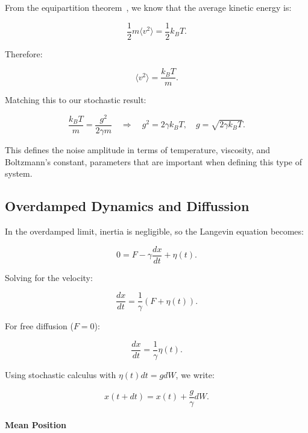 From the equipartition theorem~\cite{huang2009introduction}, we know that the average kinetic energy is:

\[
  \frac{1}{2} m \langle v^2 \rangle = \frac{1}{2} k_B T \text{.}
\]

Therefore:

\begin{equation}
  \langle v^2 \rangle = \frac{k_B T}{m} \text{.}
\end{equation}

Matching this to our stochastic result:

\begin{equation}
  \frac{k_B T}{m} = \frac{g^2}{2 \gamma m} \quad \Rightarrow \quad g^2 = 2 \gamma k_B T, \quad g = \sqrt{2 \gamma k_B T} \text{.}
\end{equation}

This defines the noise amplitude in terms of temperature, viscosity, and Boltzmann’s constant, parameters that are important when defining this type of system.

\subsection{Overdamped Dynamics and Diffussion}

In the overdamped limit, inertia is negligible, so the Langevin equation becomes:

\begin{equation}
  0 = F - \gamma \frac{dx}{dt} + \eta(t) \text{.}
\end{equation}

Solving for the velocity:

\begin{equation}
  \frac{dx}{dt} = \frac{1}{\gamma} (F + \eta(t)) \text{.}
\end{equation}

For free diffusion (\( F = 0 \)):

\begin{equation}
  \frac{dx}{dt} = \frac{1}{\gamma} \eta(t) \text{.}
\end{equation}

Using stochastic calculus with \( \eta(t) dt = g dW \), we write:

\begin{equation}
  x(t + dt) = x(t) + \frac{g}{\gamma} dW \text{.}
\end{equation}

\paragraph{Mean Position}


